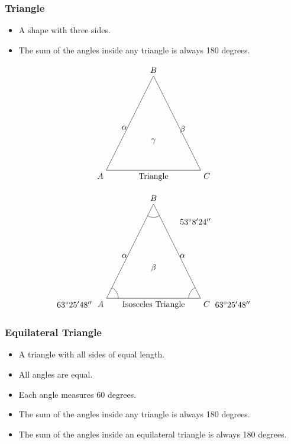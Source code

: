 \subsubsection{Triangle}
\begin{itemize}
    \item A shape with three sides.
    \item The sum of the angles inside any triangle is always 180 degrees.
\end{itemize}
\[
\begin{tikzpicture}
    \draw (0,0) -- (2,4) -- (4,0) -- cycle;
    \node[below] at (2,0) {Triangle};
    \node[below left] at (0,0) {$A$};
    \node[above] at (2,4) {$B$};
    \node[below right] at (4,0) {$C$};
    \node[below left] at (1,2) {$\alpha$};
    \node[below right] at (3,2) {$\beta$};
    \node[above] at (2,1) {$\gamma$};
\end{tikzpicture}
\]

\[ 
\begin{tikzpicture}
    \draw (0,0) -- (2,4) -- (4,0) -- cycle;
    \node[below] at (2,0) {Isosceles Triangle};
    \node[below left] at (0,0) {$A$};
    \node[above] at (2,4) {$B$};
    \node[below right] at (4,0) {$C$};
    \node[below left] at (1,2) {$\alpha$};
    \node[below right] at (3,2) {$\alpha$};
    \node[above] at (2,1) {$\beta$};
    \draw (.5,0) arc[start angle=0, end angle=63.43, radius=0.5];
    \draw (3.5,0) arc[start angle=180, end angle=116.57, radius=0.5];
    \draw (1.75,3.5) arc[start angle=240, end angle=300, radius=0.5];
    \node[above right] at (3,3) {\(53^\circ 8' 24''\)};
    \node[below left] at (-0.5,0) {\(63^\circ 25' 48''\)};
    \node[below right] at (4.5,0) {\(63^\circ 25' 48''\)};
\end{tikzpicture}
\]

\subsubsection{Equilateral Triangle}
\begin{itemize}
    \item A triangle with all sides of equal length.
    \item All angles are equal.
    \item Each angle measures 60 degrees.
    \item The sum of the angles inside any triangle is always 180 degrees.
    \item The sum of the angles inside an equilateral triangle is always 180 degrees.
\end{itemize}

